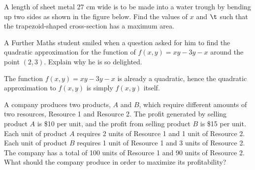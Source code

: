 \begin{problem}
    A length of sheet metal 27 cm wide is to be made into a water trough by bending up two sides as shown in the figure below. Find the values of $x$ and $\t$ such that the trapezoid-shaped cross-section has a maximum area.

    \begin{center}
    \end{center}
\end{problem}

\begin{problem}
    A Further Maths student smiled when a question asked for him to find the quadratic approximation for the function of $f(x, y) = xy - 3y - x$ around the point $(2, 3)$. Explain why he is so delighted.
\end{problem}
\begin{solution}
    The function $f(x, y) = xy - 3y - x$ is already a quadratic, hence the quadratic approximation to $f(x, y)$ is simply $f(x, y)$ itself.
\end{solution}

\begin{problem}
    A company produces two products, $A$ and $B$, which require different amounts of two resources, Resource 1 and Resource 2. The profit generated by selling product $A$ is \$10 per unit, and the profit from selling product $B$ is \$15 per unit. Each unit of product $A$ requires 2 units of Resource 1 and 1 unit of Resource 2. Each unit of product $B$ requires 1 unit of Resource 1 and 3 units of Resource 2. The company has a total of 100 units of Resource 1 and 90 units of Resource 2. What should the company produce in order to maximize its profitability?
\end{problem}